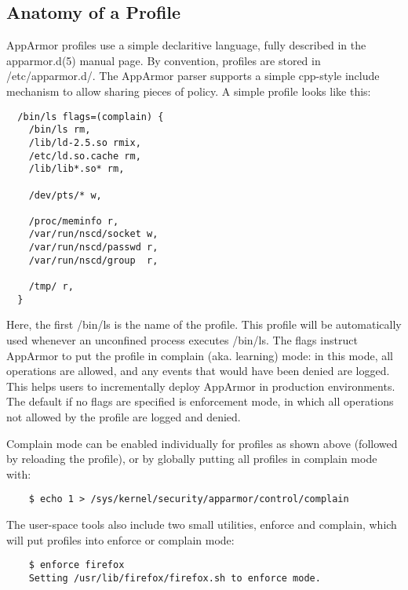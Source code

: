 \documentclass[a4paper]{article}
\renewcommand{\H}{\hspace{0pt}}
\begin{document}
\subsection{Anatomy of a Profile}

AppArmor profiles use a simple declaritive language, fully described in
the apparmor.d(5) manual page. By convention, profiles are stored in
/etc/{\H}apparmor.d/. The AppArmor parser supports a simple cpp-style
include mechanism to allow sharing pieces of policy.  A simple profile
looks like this:

\begin{small}
\begin{verbatim}
  /bin/ls flags=(complain) {
    /bin/ls rm,
    /lib/ld-2.5.so rmix,
    /etc/ld.so.cache rm,
    /lib/lib*.so* rm,

    /dev/pts/* w,

    /proc/meminfo r,
    /var/run/nscd/socket w,
    /var/run/nscd/passwd r,
    /var/run/nscd/group  r,

    /tmp/ r,
  }
\end{verbatim}
\end{small}

Here, the first /bin/ls is the name of the profile. This profile will be
automatically used whenever an unconfined process executes /bin/ls.  The
flags instruct AppArmor to put the profile in complain (aka. learning)
mode: in this mode, all operations are allowed, and any events that
would have been denied are logged.  This helps users to incrementally
deploy AppArmor in production environments.  The default if no flags are
specified is enforcement mode, in which all operations not allowed by
the profile are logged and denied.

Complain mode can be enabled individually for profiles as shown above
(followed by reloading the profile), or by globally putting all profiles
in complain mode with:

\begin{small}
\begin{verbatim}
    $ echo 1 > /sys/kernel/security/apparmor/control/complain
\end{verbatim}
\end{small}

The user-space tools also include two small utilities, enforce and
complain, which will put profiles into enforce or complain mode:

\begin{small}
\begin{verbatim}
    $ enforce firefox
    Setting /usr/lib/firefox/firefox.sh to enforce mode.
\end{verbatim}
\end{small}
\end{document}
